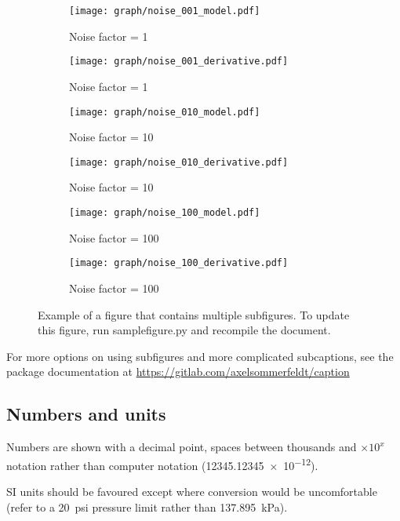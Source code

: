 \documentclass[a4paper,12pt]{article}
\begin{document}
\begin{figure}[htbp]
	\begin{subfigure}[b]{0.5\textwidth}
		\centering
    \texttt{[image: graph/noise\_001\_model.pdf]}
		\caption{Noise factor = \num{1}}\label{fig:1a}
	\end{subfigure}\hfill  
	\begin{subfigure}[b]{0.5\textwidth}
		\centering
    \texttt{[image: graph/noise\_001\_derivative.pdf]}
		\caption{Noise factor = \num{1}}\label{fig:1b}
	\end{subfigure}\hfill
	\begin{subfigure}[b]{0.5\textwidth}
		\centering
    \texttt{[image: graph/noise\_010\_model.pdf]}
		\caption{Noise factor = \num{10}}\label{fig:1c}
	\end{subfigure}\hfill
	\begin{subfigure}[b]{0.5\textwidth}
		\centering
    \texttt{[image: graph/noise\_010\_derivative.pdf]}
		\caption{Noise factor = \num{10}}\label{fig:1d}
	\end{subfigure}\hfill
	\begin{subfigure}[b]{0.5\textwidth}
		\centering
    \texttt{[image: graph/noise\_100\_model.pdf]}
		\caption{Noise factor = \num{100}}\label{fig:1e}
	\end{subfigure}\hfill
	\begin{subfigure}[b]{0.5\textwidth}
		\centering
    \texttt{[image: graph/noise\_100\_derivative.pdf]}
		\caption{Noise factor = \num{100}}\label{fig:1f}
	\end{subfigure}
	\caption[Short caption which will be in the table of figures]{Example of a figure that contains multiple subfigures.  To update this figure, run samplefigure.py and recompile the document.}
	\label{fig:subcaptionfigure}
\end{figure}

For more options on using subfigures and more complicated subcaptions, see the package documentation at \url{https://gitlab.com/axelsommerfeldt/caption} 

\subsection{Numbers and units}
Numbers are shown with a decimal point, spaces between thousands and $\times 10^x$ notation rather than computer notation (\num{12345.12345e-12}).

SI units should be favoured except where conversion would be
uncomfortable (refer to a \SI{20}{psi} pressure limit rather than
\SI{137.895}{\kilo\pascal}).
\end{document}
